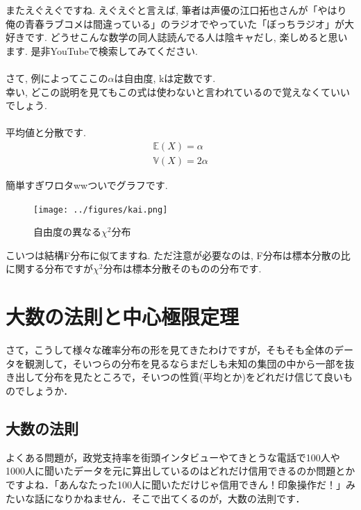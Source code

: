 \documentclass[11pt,a4paper,uplatex]{ujreport} 	%
\begin{document}
またえぐえぐですね. えぐえぐと言えば, 筆者は声優の江口拓也さんが「やはり俺の青春ラブコメは間違っている」のラジオでやっていた「ぼっちラジオ」が大好きです. どうせこんな数学の同人誌読んでる人は陰キャだし, 楽しめると思います. 是非YouTubeで検索してみてください.\\
\\

さて, 例によってここの$\alpha$は自由度, kは定数です.\\

幸い, どこの説明を見てもこの式は使わないと言われているので覚えなくていいでしょう.\\
\\

平均値と分散です.
\begin{align}
\mathbb{E}(X) = \alpha \\
\mathbb{V}(X) = 2\alpha
\end{align}

簡単すぎワロタwwついでグラフです.


\begin{figure}[H]
\label{im:chi}
  \centering
  \texttt{[image: ../figures/kai.png]}
  \caption{自由度の異なる$\chi^2$分布}
\end{figure}
 
こいつは結構F分布に似てますね. ただ注意が必要なのは, F分布は標本分散の比に関する分布ですが$\chi^2$分布は標本分散そのものの分布です.


\chapter{大数の法則と中心極限定理}
さて，こうして様々な確率分布の形を見てきたわけですが，そもそも全体のデータを観測して，そいつらの分布を見るならまだしも未知の集団の中から一部を抜き出して分布を見たところで，そいつの性質(平均とか)をどれだけ信じて良いものでしょうか．\\


\section{大数の法則}

よくある問題が，政党支持率を街頭インタビューやてきとうな電話で100人や1000人に聞いたデータを元に算出しているのはどれだけ信用できるのか問題とかですよね．「あんなたった100人に聞いただけじゃ信用できん！印象操作だ！」みたいな話になりかねません．そこで出てくるのが，大数の法則です．\\
\\
\end{document}
